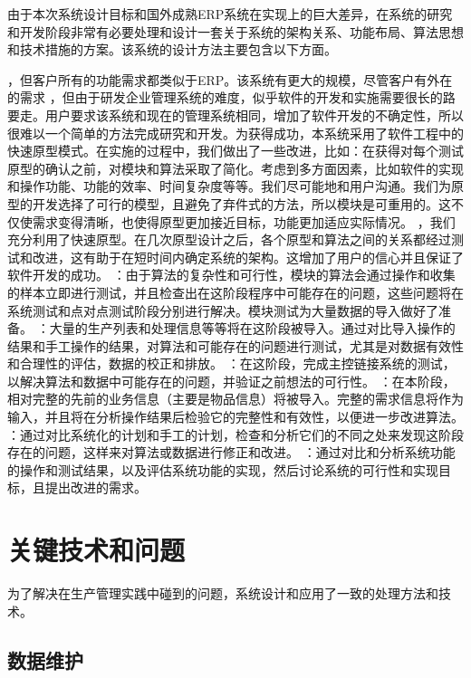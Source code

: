 由于本次系统设计目标和国外成熟ERP系统在实现上的巨大差异，在系统的研究和开发阶段非常有必要处理和设计一套关于系统的架构关系、功能布局、算法思想和技术措施的方案。该系统的设计方法主要包含以下方面。
\begin{itemize}
，但客户所有的功能需求都类似于ERP。该系统有更大的规模，尽管客户有外在的需求 ，但由于研发企业管理系统的难度，似乎软件的开发和实施需要很长的路要走。用户要求该系统和现在的管理系统相同，增加了软件开发的不确定性，所以很难以一个简单的方法完成研究和开发。为获得成功，本系统采用了软件工程中的快速原型模式。在实施的过程中，我们做出了一些改进，比如：在获得对每个测试原型的确认之前，对模块和算法采取了简化。考虑到多方面因素，比如软件的实现和操作功能、功能的效率、时间复杂度等等。我们尽可能地和用户沟通。我们为原型的开发选择了可行的模型，且避免了弃件式的方法，所以模块是可重用的。这不仅使需求变得清晰，也使得原型更加接近目标，功能更加适应实际情况。
，我们充分利用了快速原型。在几次原型设计之后，各个原型和算法之间的关系都经过测试和改进，这有助于在短时间内确定系统的架构。这增加了用户的信心并且保证了软件开发的成功。
：由于算法的复杂性和可行性，模块的算法会通过操作和收集的样本立即进行测试，并且检查出在这阶段程序中可能存在的问题，这些问题将在系统测试和点对点测试阶段分别进行解决。模块测试为大量数据的导入做好了准备。
：大量的生产列表和处理信息等等将在这阶段被导入。通过对比导入操作的结果和手工操作的结果，对算法和可能存在的问题进行测试，尤其是对数据有效性和合理性的评估，数据的校正和排放。
：在这阶段，完成主控链接系统的测试，以解决算法和数据中可能存在的问题，并验证之前想法的可行性。
：在本阶段，相对完整的先前的业务信息（主要是物品信息）将被导入。完整的需求信息将作为输入，并且将在分析操作结果后检验它的完整性和有效性，以便进一步改进算法。
：通过对比系统化的计划和手工的计划，检查和分析它们的不同之处来发现这阶段存在的问题，这样来对算法或数据进行修正和改进。
：通过对比和分析系统功能的操作和测试结果，以及评估系统功能的实现，然后讨论系统的可行性和实现目标，且提出改进的需求。
\end{itemize}
\section{关键技术和问题}

为了解决在生产管理实践中碰到的问题，系统设计和应用了一致的处理方法和技术。

\subsection{数据维护}

